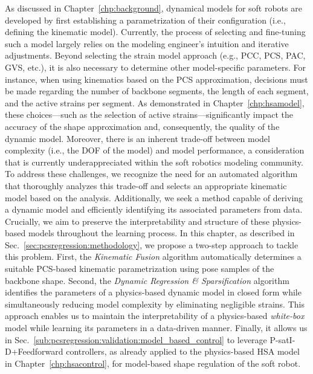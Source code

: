 \begin{foreword}
    As discussed in Chapter~\ref{chp:background}, dynamical models for soft robots are developed by first establishing a parametrization of their configuration (i.e., defining the kinematic model). Currently, the process of selecting and fine-tuning such a model largely relies on the modeling engineer’s intuition and iterative adjustments. Beyond selecting the strain model approach (e.g., \gls{PCC}, \gls{PCS}, \gls{PAC}, \gls{GVS}, etc.), it is also necessary to determine other model-specific parameters. For instance, when using kinematics based on the \gls{PCS} approximation, decisions must be made regarding the number of backbone segments, the length of each segment, and the active strains per segment. As demonstrated in Chapter~\ref{chp:hsamodel}, these choices—such as the selection of active strains—significantly impact the accuracy of the shape approximation and, consequently, the quality of the dynamic model. Moreover, there is an inherent trade-off between model complexity (i.e., the \gls{DOF} of the model) and model performance, a consideration that is currently underappreciated within the soft robotics modeling community.
    To address these challenges, we recognize the need for an automated algorithm that thoroughly analyzes this trade-off and selects an appropriate kinematic model based on the analysis. Additionally, we seek a method capable of deriving a dynamic model and efficiently identifying its associated parameters from data. Crucially, we aim to preserve the interpretability and structure of these physics-based models throughout the learning process.
    In this chapter, as described in Sec.~\ref{sec:pcsregression:methodology}, we propose a two-step approach to tackle this problem. First, the \emph{Kinematic Fusion} algorithm automatically determines a suitable \gls{PCS}-based kinematic parametrization using pose samples of the backbone shape. Second, the \emph{Dynamic Regression \& Sparsification} algorithm identifies the parameters of a physics-based dynamic model in closed form while simultaneously reducing model complexity by eliminating negligible strains. This approach enables us to maintain the interpretability of a physics-based \emph{white-box} model while learning its parameters in a data-driven manner. Finally, it allows us in Sec.~\ref{sub:pcsregression:validation:model_based_control} to leverage P-satI-D+Feedforward controllers, as already applied to the physics-based \gls{HSA} model in Chapter~\ref{chp:hsacontrol}, for model-based shape regulation of the soft robot.
\end{foreword}

